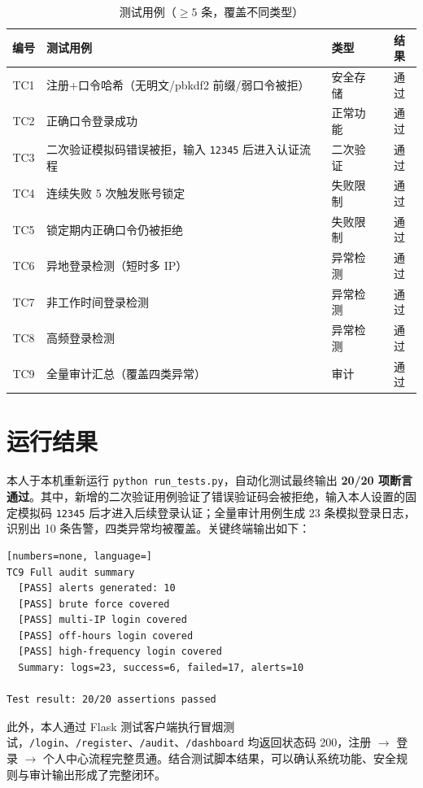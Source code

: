 \documentclass[bwprint]{report}
\begin{document}
\begin{table}[H]
    \caption{测试用例（$\geq 5$ 条，覆盖不同类型）}
    \label{tab:testcase}
    \centering
    \begin{tabular}{cllc}
        \toprule[1.5pt]
        编号 & 测试用例 & 类型 & 结果 \\
        \midrule[1pt]
        TC1 & 注册+口令哈希（无明文/pbkdf2 前缀/弱口令被拒） & 安全存储 & 通过 \\
        TC2 & 正确口令登录成功 & 正常功能 & 通过 \\
        TC3 & 二次验证模拟码错误被拒，输入 \texttt{12345} 后进入认证流程 & 二次验证 & 通过 \\
        TC4 & 连续失败 5 次触发账号锁定 & 失败限制 & 通过 \\
        TC5 & 锁定期内正确口令仍被拒绝 & 失败限制 & 通过 \\
        TC6 & 异地登录检测（短时多 IP） & 异常检测 & 通过 \\
        TC7 & 非工作时间登录检测 & 异常检测 & 通过 \\
        TC8 & 高频登录检测 & 异常检测 & 通过 \\
        TC9 & 全量审计汇总（覆盖四类异常） & 审计 & 通过 \\
        \bottomrule[1.5pt]
    \end{tabular}
\end{table}

\section{运行结果}
本人于本机重新运行 \texttt{python run\_tests.py}，自动化测试最终输出 \textbf{20/20 项断言通过}。其中，新增的二次验证用例验证了错误验证码会被拒绝，输入本人设置的固定模拟码 \texttt{12345} 后才进入后续登录认证；全量审计用例生成 23 条模拟登录日志，识别出 10 条告警，四类异常均被覆盖。关键终端输出如下：

\begin{lstlisting}[numbers=none, language=]
TC9 Full audit summary
  [PASS] alerts generated: 10
  [PASS] brute force covered
  [PASS] multi-IP login covered
  [PASS] off-hours login covered
  [PASS] high-frequency login covered
  Summary: logs=23, success=6, failed=17, alerts=10

Test result: 20/20 assertions passed
\end{lstlisting}

此外，本人通过 Flask 测试客户端执行冒烟测试，\texttt{/login}、\texttt{/register}、\texttt{/audit}、\texttt{/dashboard} 均返回状态码 200，注册 $\rightarrow$ 登录 $\rightarrow$ 个人中心流程完整贯通。结合测试脚本结果，可以确认系统功能、安全规则与审计输出形成了完整闭环。
\end{document}
